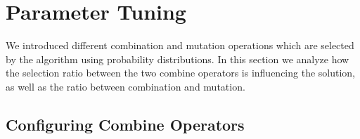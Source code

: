 \documentclass[a4paper,12pt,titlepage, BCOR7mm,headsepline]{scrbook}
\numberwithin{equation}{section}
\begin{document}
\section{Parameter Tuning}
We introduced different combination and mutation operations which are selected by the algorithm using probability distributions. In this section we analyze how the selection ratio between the two combine operators is influencing the solution, as well as the ratio between combination and mutation. 
\subsection{Configuring Combine Operators}
\end{document}
